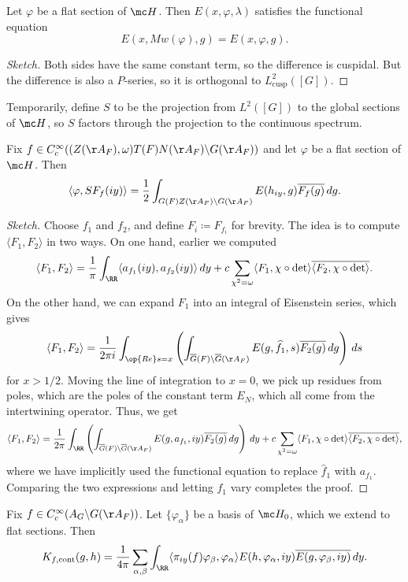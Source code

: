 \documentclass{article}
\begin{document}
\begin{corollary}
	Let $\varphi$ be a flat section of $\mc H$. Then $E(x,\varphi,\lambda)$ satisfies the functional equation
	\[E(x,Mw(\varphi),g)=E(x,\varphi,g).\]
\end{corollary}
\begin{proof}[Sketch]
	Both sides have the same constant term, so the difference is cuspidal. But the difference is also a $P$-series, so it is orthogonal to $L^2_{\mathrm{cusp}}([G])$.
\end{proof}
\begin{notation}
	Temporarily, define $S$ to be the projection from $L^2([G])$ to the global sections of $\mc H$, so $S$ factors through the projection to the continuous spectrum.
\end{notation}
\begin{lemma}
	Fix $f\in C_c^\infty((Z(\AA_F),\omega)T(F)N(\AA_F)\backslash G(\AA_F))$ and let $\varphi$ be a flat section of $\mc H$. Then
	\[\langle \varphi,SF_f(iy)\rangle=\frac12\int_{G(F)Z(\AA_F)\backslash G(\AA_F)}E(h_{iy},g)\overline{F_f(g)}\,dg.\]
\end{lemma}
\begin{proof}[Sketch]
	Choose $f_1$ and $f_2$, and define $F_i\coloneqq F_{f_i}$ for brevity. The idea is to compute $\langle F_1,F_2\rangle$ in two ways. On one hand, earlier we computed
	\[\langle F_1,F_2\rangle=\frac1\pi\int_\RR\langle a_{f_1}(iy),a_{f_2}(iy)\rangle\,dy+c\sum_{\chi^2=\omega}\langle F_1,{\chi\circ\det}\rangle\overline{\langle F_2,{\chi\circ\det}\rangle}.\]
	On the other hand, we can expand $F_1$ into an integral of Eisenstein series, which gives
	\[\langle F_1,F_2\rangle=\frac1{2\pi i}\int_{\op{Re}s=x}\left(\int_{\overline G(F)\backslash\overline G(\AA_F)}E(g,\widehat f_1,s)\overline{F_2(g)}\,dg\right)\,ds\]
	for $x>1/2$. Moving the line of integration to $x=0$, we pick up residues from poles, which are the poles of the constant term $E_N$, which all come from the intertwining operator. Thus, we get
	\[\langle F_1,F_2\rangle=\frac1{2\pi}\int_\RR\left(\int_{\overline G(F)\backslash\overline G(\AA_F)}E(g,a_{f_1},iy)\overline{F_2(g)}\,dg\right)\,dy+c\sum_{\chi^2=\omega}\langle F_1,{\chi\circ\det}\rangle\overline{\langle F_2,{\chi\circ\det}\rangle},\]
	where we have implicitly used the functional equation to replace $\widehat f_1$ with $a_{f_1}$. Comparing the two expressions and letting $f_1$ vary completes the proof.
\end{proof}
\begin{proposition}
	Fix $f\in C_c^\infty(A_G\backslash G(\AA_F))$. Let $\{\varphi_\alpha\}$ be a basis of $\mc H_0$, which we extend to flat sections. Then
	\[K_{f,\mathrm{cont}}(g,h)=\frac1{4\pi}\sum_{\alpha,\beta}\int_\RR\langle\pi_{iy}(f)\varphi_\beta,\varphi_\alpha\rangle E(h,\varphi_\alpha,iy)\overline{E(g,\varphi_\beta,iy)}\,dy.\]
\end{proposition}
\end{document}
